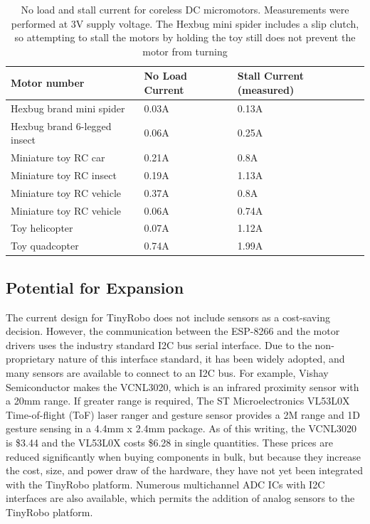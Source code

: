 \documentclass[]{article}
\begin{document}
\begin{table}
	\begin{tabular}{l l l}
	Motor number & No Load Current & Stall Current (measured)\\
	\hline 
	Hexbug brand mini spider & 0.03A & 0.13A \\
	Hexbug brand 6-legged insect & 0.06A & 0.25A \\
	Miniature toy RC car & 0.21A & 0.8A \\
	Miniature toy RC insect & 0.19A & 1.13A \\
	Miniature toy RC vehicle & 0.37A & 0.8A \\
	Miniature toy RC vehicle & 0.06A & 0.74A \\
	Toy helicopter & 0.07A & 1.12A \\
	Toy quadcopter & 0.74A & 1.99A \\
	\end{tabular}
	\caption{No load and stall current for coreless DC micromotors. Measurements were performed at 3V supply voltage. The Hexbug mini spider includes a slip clutch, so attempting to stall the motors by holding the toy still does not prevent the motor from turning}
	\label{tab:coreless}
\end{table}


\subsection{Potential for Expansion}

The current design for TinyRobo does not include sensors as a cost-saving decision. 
However, the communication between the ESP-8266 and the motor drivers uses the industry standard I2C bus serial interface. 
Due to the non-proprietary nature of this interface standard, it has been widely adopted, and many sensors are available to connect to an I2C bus. 
For example, Vishay Semiconductor makes the VCNL3020, which is an infrared proximity sensor with a 20mm range. 
If greater range is required, The ST Microelectronics VL53L0X Time-of-flight (ToF) laser ranger and gesture sensor provides a 2M range and 1D gesture sensing in a 4.4mm x 2.4mm package. 
As of this writing, the VCNL3020 is \$3.44 and the VL53L0X costs \$6.28 in single quantities.
These prices are reduced significantly when buying components in bulk, but because they increase the cost, size, and power draw of the hardware, they have not yet been integrated with the TinyRobo platform. 
Numerous multichannel ADC ICs with I2C interfaces are also available, which permits the addition of analog sensors to the TinyRobo platform. 
\end{document}
